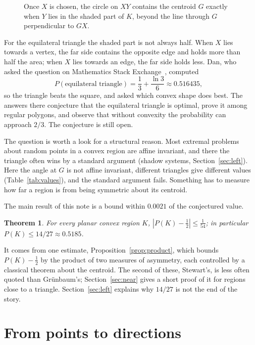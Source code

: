 \documentclass[11pt]{article}
\newtheorem{theorem}{Theorem}
\theoremstyle{remark}
\newcommand{\abs}[1]{\left|#1\right|}
\begin{document}
\begin{figure}[ht]
\centering

\caption{Once $X$ is chosen, the circle on $XY$ contains the centroid $G$ exactly when $Y$ lies in the
shaded part of $K$, beyond the line through $G$ perpendicular to $GX$.}
\label{fig:setup}
\end{figure}

For the equilateral triangle the shaded part is not always half. When $X$ lies towards a vertex, the
far side contains the opposite edge and holds more than half the area; when $X$ lies towards an edge,
the far side holds less. Dan, who asked the question on Mathematics Stack Exchange~\cite{MSE}, computed
\[
P(\text{equilateral triangle}) = \frac13+\frac{\ln 3}{6} \approx 0.516435,
\]
so the triangle beats the square, and asked which convex shape does best. The answers there
conjecture that the equilateral triangle is optimal, prove it among regular polygons, and observe that
without convexity the probability can approach $2/3$. The conjecture is still open.

The question is worth a look for a structural reason. Most extremal problems about random points in a
convex region are affine invariant, and there the triangle often wins by a standard argument (shadow
systems, Section~\ref{sec:left}). Here the angle at $G$ is not affine invariant, different triangles give
different values (Table~\ref{tab:values}), and the standard argument fails. Something has to measure
how far a region is from being symmetric about its centroid.

The main result of this note is a bound within $0.0021$ of the conjectured value.

\begin{theorem}\label{thm:A}
For every planar convex region $K$, $\abs{P(K)-\tfrac12}\le \tfrac1{54}$; in particular
$P(K)\le 14/27\approx 0.5185$.
\end{theorem}

It comes from one estimate, Proposition~\ref{prop:product}, which bounds $P(K)-\tfrac12$ by the product
of two measures of asymmetry, each controlled by a classical theorem about the centroid. The second of
these, Stewart's, is less often quoted than Gr\"unbaum's; Section~\ref{sec:near} gives a short proof of it
for regions close to a triangle. Section~\ref{sec:left} explains why $14/27$ is not the end of the
story.

\section{From points to directions}\label{sec:directions}
\end{document}
